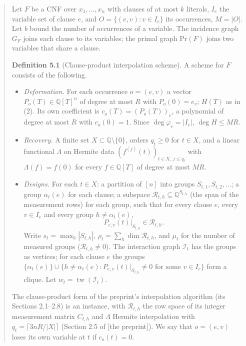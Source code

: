 \documentclass[11pt,a4paper]{article}
\makeatletter
\theoremstyle{definition}
\theoremstyle{remark}
\newcommand{\Q}{\mathbb{Q}}
\newcommand{\cR}{\mathcal{R}}
\newcommand{\cI}{\mathcal{I}}
\newcommand{\tw}{\operatorname{tw}}
\newcommand{\englishhyph}{\@ifundefined{l@english}{}{\language\l@english}}
\newenvironment{dlquote}{\begin{quote}\englishhyph}{\end{quote}}
\makeatother
\begin{document}
\begin{dlquote}
Let $F$ be a CNF over $x_1,\dots,x_n$ with clauses of at most $k$ literals, $I_e$ the variable
set of clause $e$, and $O=\{(e,v):v\in I_e\}$ its occurrences, $M=|O|$. Let $b$ bound the
number of occurrences of a variable. The incidence graph $G_F$ joins each clause to its
variables; the primal graph $\mathrm{Pr}(F)$ joins two variables that share a clause.

\textbf{Definition 5.1} (Clause-product interpolation scheme). A scheme for $F$ consists of
the following.
\begin{itemize}
\item[(a)] \emph{Deformation.} For each occurrence $o=(e,v)$ a vector $P_o(T)\in\Q[T]^n$ of
 degree at most $R$ with $P_o(0)=e_v$; $H(T)$ as in (2). Its own coefficient is
 $c_o(T)=(P_o(T))_v$, a polynomial of degree at most $R$ with $c_o(0)=1$. Since
 $\deg\varphi_e=|I_e|$, $\deg H\le MR$.
\item[(b)] \emph{Recovery.} A finite set $X\subset\Q\setminus\{0\}$, orders $q_t\ge0$ for
 $t\in X$, and a linear functional $\Lambda$ on Hermite data
 $(f^{(j)}(t))_{t\in X,\,j\le q_t}$ with $\Lambda(f)=f(0)$ for every $f\in\Q[T]$ of degree at
 most $MR$.
\item[(c)] \emph{Designs.} For each $t\in X$: a partition of $[n]$ into groups
 $S_{t,1},S_{t,2},\dots$; a group $\alpha_t(e)$ for each clause; a subspace
 $\cR_{t,h}\subseteq\Q^{S_{t,h}}$ (the span of the measurement rows) for each group, such
 that for every clause $e$, every $v\in I_e$ and every group $h\ne\alpha_t(e)$,
 \begin{equation}\tag{DL.3}\label{eq:three}
 P_{e,v}(t)\big|_{S_{t,h}}\in\cR_{t,h}.
 \end{equation}
 Write $s_t=\max_h|S_{t,h}|$, $\rho_t=\sum_h\dim\cR_{t,h}$, and $\mu_t$ for the number of
 measured groups ($\cR_{t,h}\neq0$). The interaction graph $\cI_t$ has the groups as
 vertices; for each clause $e$ the groups
 $\{\alpha_t(e)\}\cup\{h\ne\alpha_t(e):P_{e,v}(t)|_{S_{t,h}}\ne0\text{ for some }v\in I_e\}$
 form a clique. Let $w_t=\tw(\cI_t)$.
\end{itemize}
The clause-product form of the preprint's interpolation algorithm (its Sections 2.1--2.8) is
an instance, with $\cR_{t,h}$ the row space of its integer measurement matrix $C_{t,h}$ and
$\Lambda$ Hermite interpolation with $q_t=\lceil 3nR/|X|\rceil$ (Section 2.5 of [the
preprint]). We say that $o=(e,v)$ loses its own variable at $t$ if $c_o(t)=0$.
\end{dlquote}
\end{document}
